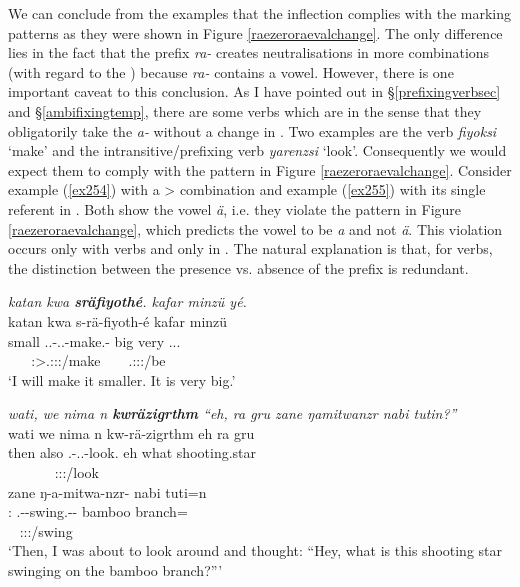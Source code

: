 We can conclude from the examples that the  inflection complies with the  marking patterns as they were shown in Figure \ref{raezeroraevalchange}. The only difference lies in the fact that the  prefix \emph{ra-} creates neutralisations in more combinations (with regard to the ) because \emph{ra-} contains a vowel. However, there is one important caveat to this conclusion. As I have pointed out in {\S}\ref{prefixingverbsec} and {\S}\ref{ambifixingtemp}, there are some verbs which are  in the sense that they obligatorily take the \emph{a-} without a change in . Two examples are the  verb \emph{fiyoksi} `make' and the intransitive/prefixing verb \emph{yarenzsi} `look'. Consequently we would expect them to comply with the pattern in Figure \ref{raezeroraevalchange}. Consider example (\ref{ex254}) with a \Sg>{\Sg}  combination and example (\ref{ex255}) with its single referent in {\Sg}. Both show the  vowel \emph{ä}, i.e. they violate the pattern in Figure \ref{raezeroraevalchange}, which predicts the vowel to be \emph{a} and not \emph{ä}. This violation occurs only with  verbs and only in  . The natural explanation is that, for  verbs, the distinction between the presence vs. absence of the  prefix is redundant.

\begin{exe}
	\ex \emph{katan kwa \textbf{sräfiyothé}. kafar minzü yé.}\\
	\glll katan kwa s-rä-fiyoth-é kafar minzü \\
	small {\Fut} \Tsg.\Masc.\Bet-\Irr.\Ndu.\Vc-make.\Rs-\Fsg{} big very \Tsg.\Masc.\Cop.\Ndu\\
	~ ~ {\footnotesize \Fsg:\Sbj>\Tsg.\Masc:\Obj:\Irr:\Pfv/make} ~ ~ {\footnotesize \Tsg.\Masc:\Sbj:\Nonpast:\Ipfv/be}\\
	\trans `I will make it smaller. It is very big.' 
	\label{ex254}
\end{exe}
\begin{exe}
	\ex \emph{wati, we nima n \textbf{kwräzigrthm} ``eh, ra gru zane ŋamitwanzr nabi tutin?''}\\
	\glll wati we nima n kw-rä-zigrthm eh ra gru\\
	then also {\Quot} {\Imn} \Fsg.\Bet-\Irr.\Ndu.\Vc-look.{\Rs} eh what shooting.star\\
	~ ~ ~ ~ {\footnotesize \Fsg:\Sbj:\Irr:\Pfv/look} ~ ~ ~\\
	\sn
	\glll zane ŋ-a-mitwa-nzr-\Zero{} nabi tuti=n\\
	\Dem:{\Prox} \M.\Alph-\Vc-swing.\Ext-\Ndu-\Stsg{} bamboo branch={\Loc}\\
	~ {\footnotesize \Stsg:\Sbj:\Nonpast:\Ipfv/swing} ~ ~\\
	\trans `Then, I was about to look around and thought: ``Hey, what is this shooting star swinging on the bamboo branch?''' 
	\label{ex255}
\end{exe}

